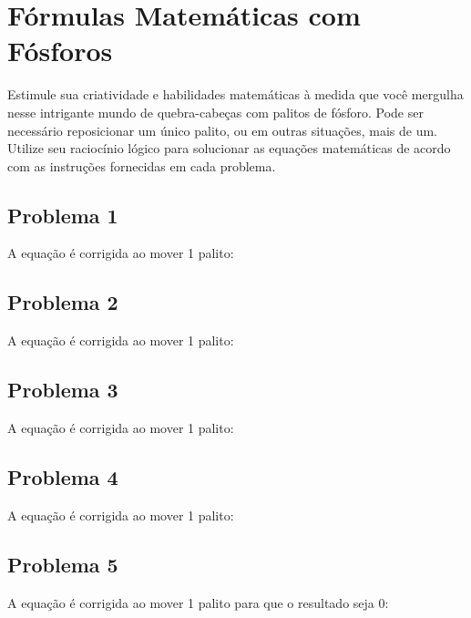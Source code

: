 \documentclass[a4paper,11pt]{article}
\begin{document}
  \maketitle %
  \thispagestyle{fancy} %
  
  \section*{Fórmulas Matemáticas com Fósforos}
  Estimule sua criatividade e habilidades matemáticas à medida que você mergulha nesse intrigante mundo de quebra-cabeças com palitos de fósforo. Pode ser necessário reposicionar um único palito, ou em outras situações, mais de um. Utilize seu raciocínio lógico para solucionar as equações matemáticas de acordo com as instruções fornecidas em cada problema.
  
  \subsection*{Problema 1}
  A equação é corrigida ao mover 1 palito:
  
  \digitThree \plus \digitTwo \equal \digitSeven

  \subsection*{Problema 2}
  A equação é corrigida ao mover 1 palito:

  \digitEight \minus \digitFive \equal \digitZero

  \subsection*{Problema 3}
  A equação é corrigida ao mover 1 palito:

  \digitSeven \minus \digitThree \equal \digitTwo

  \subsection*{Problema 4}
  A equação é corrigida ao mover 1 palito:

  \digitSix \plus \digitFour \equal \digitFour

  \subsection*{Problema 5}
  A equação é corrigida ao mover 1 palito para que o resultado seja 0:
\end{document}

